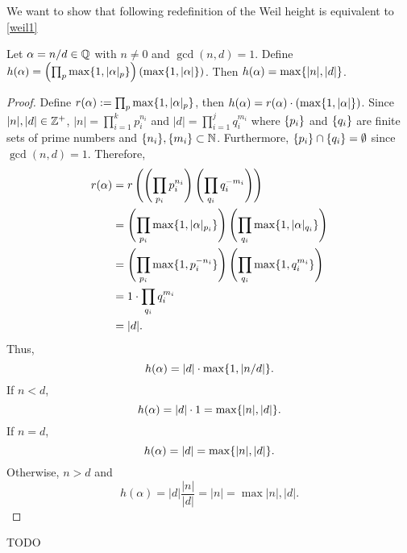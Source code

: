 \documentclass[notitlepage]{simple}
\begin{document}
We want to show that following redefinition of the Weil height is equivalent to \autoref{weil1}

\begin{thm}
	Let $\alpha=n/d\in\mathbb{Q}$ with $n\neq 0$ and $\gcd(n,d)=1$.
	Define $h(\alpha)=\left( \prod_p \max\lbrace 1,|\alpha|_p \rbrace \right)\left( \max\lbrace 1,|\alpha| \rbrace \right)$.
	Then $h(\alpha)=\max\lbrace |n|,|d| \rbrace$.
\end{thm}
\begin{proof}
	Define $r(\alpha):=\prod_p \max\lbrace 1,|\alpha|_p \rbrace$, then $h(\alpha)=r(\alpha)\cdot\left( \max\lbrace 1,|\alpha| \rbrace \right)$.
	Since $|n|,|d|\in\mathbb{Z}^+$, $|n|=\prod_{i=1}^k p_i^{n_i}$ and $|d|=\prod_{i=1}^j q_i^{m_i}$ where $\lbrace p_i \rbrace$ and $\lbrace q_i \rbrace$ are finite sets of prime numbers and $\lbrace n_i \rbrace,\lbrace m_i \rbrace\subset\mathbb{N}$.
	Furthermore, $\lbrace p_i \rbrace\cap\lbrace q_i \rbrace=\emptyset$ since $\gcd(n,d)=1$.
	Therefore,
	\begin{align*}
		r(\alpha)
		&=r\left( \left( \prod_{p_i} p_i^{n_i} \right)\left( \prod_{q_i} q_i^{-m_i} \right)  \right)\\
		&=\left( \prod_{p_i} \max\lbrace 1,|\alpha|_{p_i} \rbrace \right)\left( \prod_{q_i} \max\lbrace 1,|\alpha|_{q_i} \rbrace \right)\\
		&=\left( \prod_{p_i} \max\lbrace 1,p_i^{-n_i} \rbrace \right)\left( \prod_{q_i} \max\lbrace 1,q_i^{m_i} \rbrace \right)\\
		&=1\cdot\prod_{q_i} q_i^{m_i}\\
		&=|d|.
	\end{align*}
	Thus,
	\[
		h(\alpha)=|d|\cdot\max\lbrace 1,|n/d| \rbrace.
	\]
	If $n<d$,
	\[
		h(\alpha) = |d|\cdot 1 = \max\lbrace |n|,|d| \rbrace.
	\]
	If $n=d$,
	\[
		h(\alpha) = |d| =\max\lbrace |n|,|d| \rbrace.
	\]
	Otherwise, $n> d$ and
	\[
		h(\alpha) = |d|\frac{|n|}{|d|}=|n|=\max{|n|,|d|}.
	\]
\end{proof}
\begin{analysis}
TODO
\end{analysis}

\printbibliography
\end{document}
